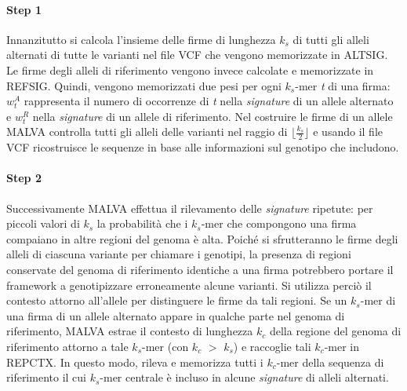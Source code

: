 \documentclass[../main.tex]{subfiles}
\begin{document}
\paragraph{Step 1} Innanzitutto si calcola l'insieme delle firme di lunghezza \textit{${k}_{s}$} di tutti gli alleli alternati di tutte le varianti nel file VCF che vengono memorizzate in ALTSIG. Le firme degli alleli di riferimento vengono invece calcolate e memorizzate in REFSIG. Quindi, vengono memorizzati due pesi per ogni \textit{${k}_{s}$}-mer \textit{t} di una firma: \textit{$w_{t}^{A}$} rappresenta il numero di occorrenze di \textit{t} nella \textit{signature} di un allele alternato e \textit{$w_{t}^{R}$} nella \textit{signature} di un allele di riferimento. Nel costruire le firme di un allele MALVA controlla tutti gli alleli delle varianti nel raggio di $\lfloor \frac{ {{{k}_{s}} }}{2}  \rfloor$ e  usando il file VCF ricostruisce le sequenze in base alle informazioni sul genotipo che includono. 

\paragraph{Step 2} Successivamente MALVA effettua il rilevamento delle \textit{signature} ripetute: per piccoli valori di  \textit{${k}_{s}$} la probabilità che i  \textit{${k}_{s}$}-mer che compongono una firma compaiano in altre regioni del genoma è alta. Poiché si sfrutteranno le firme degli alleli di ciascuna variante per chiamare i genotipi, la presenza di regioni conservate del genoma di riferimento identiche a una firma potrebbero portare il framework a genotipizzare erroneamente alcune varianti. Si utilizza perciò il contesto attorno all'allele per distinguere le firme da tali regioni. Se un  \textit{${k}_{s}$}-mer di una firma di un allele alternato appare in qualche parte nel genoma di riferimento, MALVA estrae il contesto di lunghezza  \textit{${k}_{c}$} della regione del genoma di riferimento attorno a tale \textit{${k}_{s}$}-mer (con  \textit{${k}_{c}$} $>$ \textit{${k}_{s}$}) e raccoglie tali \textit{${k}_{c}$}-mer in REPCTX. In questo modo, rileva e memorizza tutti i \textit{${k}_{c}$}-mer della sequenza di riferimento il cui \textit{${k}_{s}$}-mer centrale è incluso in alcune \textit{signature} di alleli alternati. 
\end{document}
